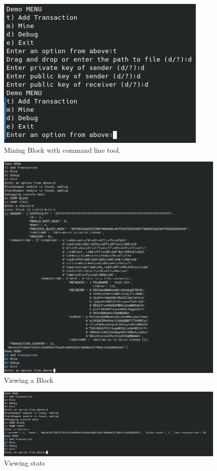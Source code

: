 \documentclass[conference]{IEEEtran}
\begin{document}
\begin{figure}[h!]
	\centering
	\includegraphics[width=0.7\linewidth]{Mining}
	\caption{Mining Block with command line tool.}
	\label{fig:mining}
\end{figure}
\begin{figure}[h!]
	\centering
	\includegraphics[width=0.7\linewidth]{ViewBlock}
	\caption{Viewing a Block}
	\label{fig:viewblock}
\end{figure}
\begin{figure}[h!]
	\centering
	\includegraphics[width=0.7\linewidth]{ViewStats}
	\caption{Viewing stats}
	\label{fig:viewstats}
\end{figure}
\end{document}
